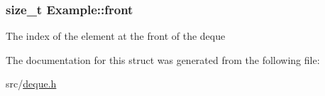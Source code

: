 \subsubsection[{\texorpdfstring{front}{front}}]{\setlength{\rightskip}{0pt plus 5cm}size\+\_\+t Example\+::front}\hypertarget{structExample_ad28f26e5c53b98255d98b65e82fae766}{}\label{structExample_ad28f26e5c53b98255d98b65e82fae766}
The index of the element at the front of the deque 

The documentation for this struct was generated from the following file\+:\begin{DoxyCompactItemize}
\item 
src/\hyperlink{deque_8h}{deque.\+h}\end{DoxyCompactItemize}
